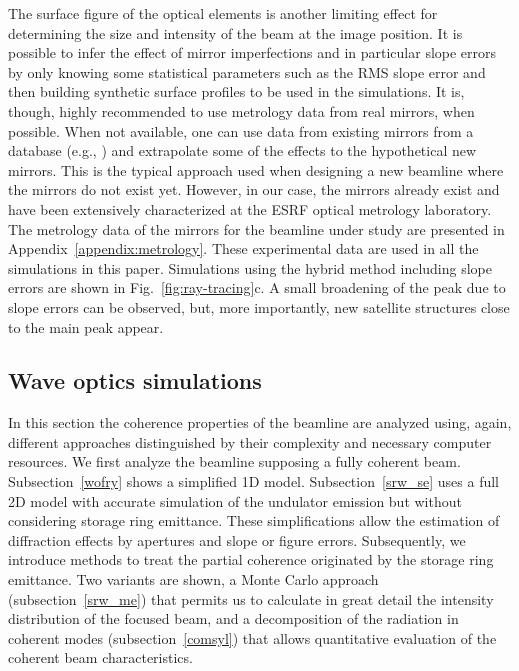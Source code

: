 \documentclass{iucr}              %
\begin{document}
The surface figure of the optical elements is another limiting effect for determining the size and intensity of the beam at the image position. It is possible to infer the effect of mirror imperfections and in particular slope errors by only knowing some statistical parameters such as the RMS slope error and then building synthetic surface profiles to be used in the simulations. It is, though, highly recommended to use metrology data from real mirrors, when possible. When not available, one can use data from existing mirrors from a database (e.g., \cite{dabam}) and extrapolate some of the effects to the hypothetical new mirrors. This is the typical approach used when designing a new beamline where the mirrors do not exist yet. However, in our case, the mirrors already exist and have been extensively characterized at the ESRF optical metrology laboratory.  The metrology data of the mirrors for the beamline under study are presented in Appendix~\ref{appendix:metrology}. These experimental data are used in all the simulations in this paper. Simulations using the hybrid method including slope errors are shown in Fig.~\ref{fig:ray-tracing}c. A small broadening of the peak due to slope errors can be observed, but, more importantly, new satellite structures close to the main peak appear. 

 
\subsection{Wave optics simulations}
\label{level2}

In this section the coherence properties of the beamline are analyzed using, again, different approaches distinguished by their complexity and necessary computer resources. We first analyze the beamline supposing a fully coherent beam. Subsection~\ref{wofry} shows a simplified 1D model. Subsection~\ref{srw_se} uses a full 2D model with accurate simulation of the undulator emission but without considering storage ring emittance. These simplifications allow the estimation of diffraction effects by apertures and slope or figure errors. Subsequently, we introduce methods to treat the partial coherence originated by the storage ring emittance. Two variants are shown, a Monte Carlo approach (subsection~\ref{srw_me}) that permits us to calculate in great detail the intensity distribution of the focused beam, and a decomposition of the radiation in coherent modes (subsection~\ref{comsyl}) that allows quantitative evaluation of the coherent beam characteristics.  
\end{document}

